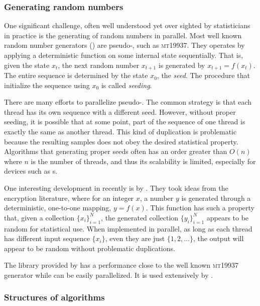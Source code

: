 \subsubsection{Generating random numbers}
\label{ssub:Generating random numbers}

One significant challenge, often well understood yet over sighted by
statisticians in practice is the generating of random numbers in parallel.
Most well known random number generators (\rng) are pseudo-\rng, such as
\textsc{mt19937}. They operates by applying a deterministic function on some
internal state sequentially. That is, given the state $x_t$, the next random
number $x_{t+1}$ is generated by $x_{t+1} = f(x_t)$. The entire sequence is
determined by the state $x_0$, the \emph{seed}. The procedure that initialize
the sequence using $x_0$ is called \emph{seeding}.

There are many efforts to parallelize pseudo-\rng. The common strategy is that
each thread has its own \rng sequence with a different seed. However, without
proper seeding, it is possible that at some point, part of the sequence of one
thread is exactly the same as another thread. This kind of duplication is
problematic because the resulting samples does not obey the desired
statistical property. Algorithms that generating proper seeds often has an
order greater than $O(n)$ where $n$ is the number of threads, and thus its
scalability is limited, especially for devices such as \gpu{}s.

One interesting development in recently is by \cite{Salmon:2011um}. They took
ideas from the encryption literature, where for an integer $x$, a number $y$
is generated through a deterministic, one-to-one mapping, $y = f(x)$. This
function has such a property that, given a collection $\{x_i\}_{i=1}^N$, the
generated collection $\{y_i\}_{i=1}^N$ appears to be random for statistical
use. When implemented in parallel, as long as each thread has different input
sequence $\{x_i\}$, even they are just $\{1,2,\dots\}$, the output will appear
to be random without problematic duplications.

The library provided by \cite{Salmon:2011um} has a performance close to the
well known \textsc{mt19937} generator while can be easily parallelized. It is
used extensively by \vsmc.

\subsubsection{Structures of algorithms}
\label{ssub:Structures of algorithms}

